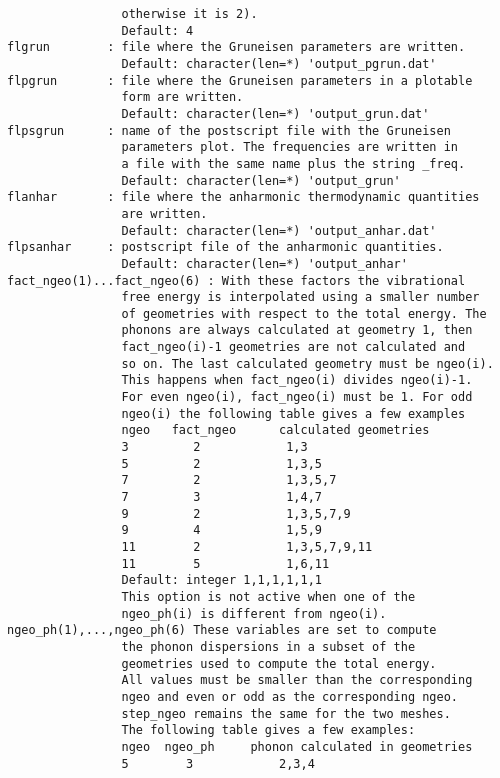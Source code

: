 \documentclass[12pt,a4paper,twoside]{report}
\begin{document}
\begin{verbatim}
                otherwise it is 2).
                Default: 4
flgrun        : file where the Gruneisen parameters are written. 
                Default: character(len=*) 'output_pgrun.dat'
flpgrun       : file where the Gruneisen parameters in a plotable 
                form are written.
                Default: character(len=*) 'output_grun.dat'
flpsgrun      : name of the postscript file with the Gruneisen 
                parameters plot. The frequencies are written in 
                a file with the same name plus the string _freq.
                Default: character(len=*) 'output_grun'
flanhar       : file where the anharmonic thermodynamic quantities 
                are written.
                Default: character(len=*) 'output_anhar.dat'
flpsanhar     : postscript file of the anharmonic quantities.
                Default: character(len=*) 'output_anhar'
fact_ngeo(1)...fact_ngeo(6) : With these factors the vibrational 
                free energy is interpolated using a smaller number 
                of geometries with respect to the total energy. The 
                phonons are always calculated at geometry 1, then 
                fact_ngeo(i)-1 geometries are not calculated and 
                so on. The last calculated geometry must be ngeo(i). 
                This happens when fact_ngeo(i) divides ngeo(i)-1. 
                For even ngeo(i), fact_ngeo(i) must be 1. For odd 
                ngeo(i) the following table gives a few examples
                ngeo   fact_ngeo      calculated geometries
                3         2            1,3
                5         2            1,3,5
                7         2            1,3,5,7
                7         3            1,4,7
                9         2            1,3,5,7,9
                9         4            1,5,9
                11        2            1,3,5,7,9,11
                11        5            1,6,11
                Default: integer 1,1,1,1,1,1
                This option is not active when one of the 
                ngeo_ph(i) is different from ngeo(i).
ngeo_ph(1),...,ngeo_ph(6) These variables are set to compute 
                the phonon dispersions in a subset of the 
                geometries used to compute the total energy. 
                All values must be smaller than the corresponding 
                ngeo and even or odd as the corresponding ngeo. 
                step_ngeo remains the same for the two meshes.
                The following table gives a few examples:
                ngeo  ngeo_ph     phonon calculated in geometries
                5        3            2,3,4

\end{verbatim}
\end{document}
